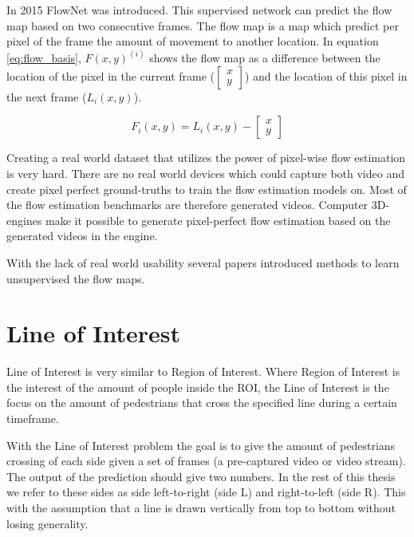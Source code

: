 
In 2015 FlowNet was introduced. This supervised network can predict the flow map based on two consecutive frames. The flow map is a map which predict per pixel of the frame the amount of movement to another location. In equation \ref{eq:flow_basis}, $F(x, y)^{(i)}$ shows the flow map as a difference between the location of the pixel in the current frame ($\begin{bmatrix} x \\ y \end{bmatrix}$) and the location of this pixel in the next frame ($L_i(x, y)$).

\begin{equation}
\label{eq:flow_basis}
F_i(x, y) = L_i(x, y) - \begin{bmatrix} x \\ y \end{bmatrix}
\end{equation}

Creating a real world dataset that utilizes the power of pixel-wise flow estimation is very hard. There are no real world devices which could capture both video and create pixel perfect ground-truths to train the flow estimation models on. Most of the flow estimation benchmarks are therefore generated videos. Computer 3D-engines make it possible to generate pixel-perfect flow estimation based on the generated videos in the engine.

With the lack of real world usability several papers introduced methods to learn unsupervised the flow maps.

\section{Line of Interest}
Line of Interest is very similar to Region of Interest. Where Region of Interest is the interest of the amount of people inside the ROI, the Line of Interest is the focus on the amount of pedestrians that cross the specified line during a certain timeframe.

With the Line of Interest problem the goal is to give the amount of pedestrians crossing of each side given a set of frames (a pre-captured video or video stream). The output of the prediction should give two numbers. In the rest of this thesis we refer to these sides as side left-to-right (side L) and right-to-left (side R). This with the assumption that a line is drawn vertically from top to bottom without losing generality.

